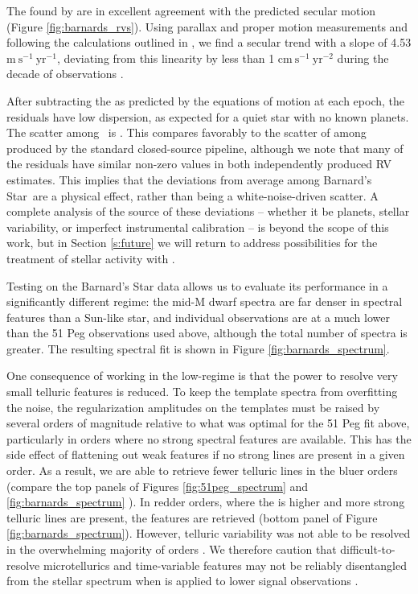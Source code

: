 \documentclass[modern]{aastex62}
\newcommand{\Mdwarf}{Barnard's Star\xspace} %
\begin{document}
The \RVs found by \wobble are in excellent agreement with the predicted secular motion (Figure \ref{fig:barnards_rvs}). 
Using \gaia parallax and proper motion measurements and following the calculations outlined in \citet{Kurster2003}, we find a secular trend with a slope of 4.53 $\mathrm{m}~\mathrm{s}^{-1}~\mathrm{yr}^{-1}$, deviating from this linearity by less than 1 $\mathrm{cm}~\mathrm{s}^{-1}~\mathrm{yr}^{-2}$ during the decade of \HARPS observations \citep{gaia2016, gaia2018}. 

After subtracting the \RVs as predicted by the equations of motion at each epoch, the residuals have low dispersion, as expected for a quiet star with no known planets. 
The  scatter among \wobble\ \RVs is  \ms. 
This compares favorably to the scatter of  \ms among \RVs produced by the standard closed-source \HARPS pipeline, although we note that many of the residuals have similar non-zero values in both independently produced RV estimates. 
This implies that the deviations from average among \Mdwarf\ \RVs are a physical effect, rather than being a white-noise-driven scatter. 
A complete analysis of the source of these \RV deviations -- whether it be planets, stellar variability, or imperfect instrumental calibration -- is beyond the scope of this work, but in Section \ref{s:future} we will return to address possibilities for the treatment of stellar activity with \wobble.

Testing \wobble on the \Mdwarf data allows us to evaluate its performance in a significantly different regime: the mid-M dwarf spectra are far denser in spectral features than a Sun-like star, and individual observations are at a much lower \SNR than the 51 Peg observations used above, although the total number of spectra is greater. 
The resulting spectral fit is shown in Figure \ref{fig:barnards_spectrum}.

One consequence of working in the low-\SNR regime is that the power to resolve very small telluric features is reduced. 
To keep the template spectra from overfitting the noise, the regularization amplitudes on the templates must be raised by several orders of magnitude relative to what was optimal for the 51 Peg fit above, particularly in orders where no strong spectral features are available. 
This has the side effect of flattening out weak features if no strong lines are present in a given order. 
As a result, we are able to retrieve fewer telluric lines in the bluer orders (compare the top panels of Figures \ref{fig:51peg_spectrum} and \ref{fig:barnards_spectrum} ). 
In redder orders, where the \SNR is higher and more strong telluric lines are present, the features are retrieved (bottom panel of Figure \ref{fig:barnards_spectrum}). 
However, telluric variability was not able to be resolved in the overwhelming majority of orders . 
We therefore caution that difficult-to-resolve microtellurics and time-variable features may not be reliably disentangled from the stellar spectrum when \wobble is applied to lower signal observations .
\end{document}

